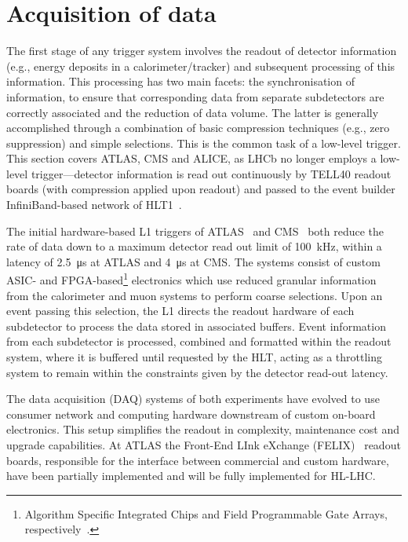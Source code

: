 \section{Acquisition of data}
The first stage of any trigger system involves the readout of detector information (e.g.,  energy deposits in a calorimeter/tracker) and subsequent processing of this information. This processing has two main facets: the synchronisation of information, to ensure that corresponding data from separate subdetectors are correctly associated and the reduction of data volume. The latter is generally accomplished through a combination of basic compression techniques (e.g.,  zero suppression) and simple selections. This is the common task of a low-level trigger. This section covers ATLAS, CMS and ALICE, as LHCb no longer employs a low-level trigger—detector information is read out continuously by TELL40 readout boards (with compression applied upon readout) and passed to the event builder InfiniBand-based network of HLT1~\cite{LHCb:2023hlw}.


The initial hardware-based L1 triggers of ATLAS~\cite{ATLASRun3Detector} and CMS~\cite{cms2023development} both reduce the rate of data down to a maximum detector read out limit of \SI{100}{\kilo\hertz}, within a latency of \SI{2.5}{\micro\second} at ATLAS and \SI{4}{\micro\second} at CMS. The systems consist of custom ASIC- and FPGA-based\footnote{Algorithm Specific Integrated Chips and Field Programmable Gate Arrays, respectively~\cite{asics-fpgas}.} electronics which use reduced granular information from the calorimeter and muon systems to perform coarse selections. Upon an event passing this selection, the L1 directs the readout hardware of each subdetector to process the data stored in associated buffers. Event information from each subdetector is processed, combined and formatted within the readout system, where it is buffered until requested by the HLT, acting as a throttling system to remain within the constraints given by the detector read-out latency.

The data acquisition (DAQ) systems of both experiments have evolved to use consumer network and computing hardware downstream of custom on-board electronics. This setup simplifies the readout in complexity, maintenance cost and upgrade capabilities. At ATLAS the Front-End LInk eXchange (FELIX)~\cite{ATLAS:FELIX} readout boards, responsible for the interface between commercial and custom hardware, have been partially implemented and will be fully implemented for HL-LHC.

